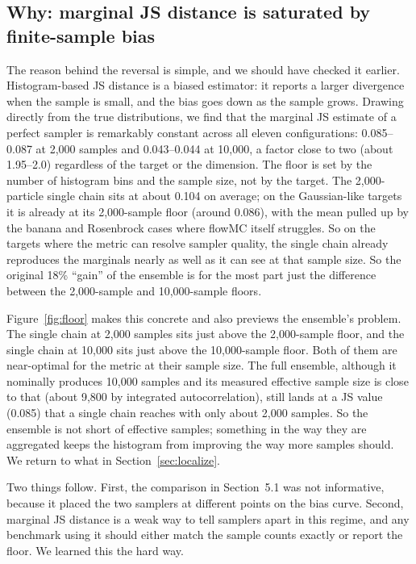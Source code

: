 \documentclass[11pt]{article}
\begin{document}
\subsection{Why: marginal JS distance is saturated by finite-sample bias}
\label{sec:why}
The reason behind the reversal is simple, and we should have checked it
earlier. Histogram-based JS distance is a biased estimator: it reports a larger
divergence when the sample is small, and the bias goes down as the sample
grows. Drawing directly from the true distributions, we find that the marginal
JS estimate of a perfect sampler is remarkably constant across all eleven
configurations: 0.085--0.087 at 2,000 samples and 0.043--0.044 at 10,000, a
factor close to two (about 1.95--2.0) regardless of the target or the dimension. The floor is
set by the number of histogram bins and the sample size, not by the target.
The 2,000-particle single chain sits at about 0.104 on average; on the
Gaussian-like targets it is already at its 2,000-sample floor (around 0.086),
with the mean pulled up by the banana and Rosenbrock cases where flowMC itself
struggles. So on the targets where the metric can resolve sampler quality, the
single chain already reproduces the marginals nearly as well as it can see at
that sample size. So the original 18\%
``gain'' of the ensemble is for the most part just the difference between the
2,000-sample and 10,000-sample floors.

Figure~\ref{fig:floor} makes this concrete and also previews the ensemble's
problem. The single chain at 2,000 samples sits just above the 2,000-sample
floor, and the single chain at 10,000 sits just above the 10,000-sample floor. Both of them are near-optimal for the metric at their sample size. The full
ensemble, although it nominally produces 10,000 samples and its measured
effective sample size is close to that (about 9,800 by integrated
autocorrelation), still lands at a JS value (0.085) that a single chain reaches
with only about 2,000 samples. So the ensemble is not short of effective
samples; something in the way they are aggregated keeps the histogram from
improving the way more samples should. We return to what in
Section~\ref{sec:localize}.

Two things follow. First, the comparison in Section~5.1 was not informative,
because it placed the two samplers at different points on the bias curve.
Second, marginal JS distance is a weak way to tell samplers apart in this
regime, and any benchmark using it should either match the sample counts
exactly or report the floor. We learned this the hard way.
\end{document}
